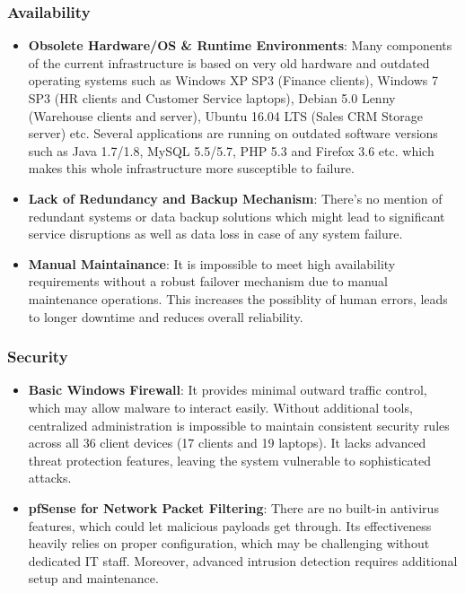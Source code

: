 \documentclass{llncs}
\begin{document}
\subsubsection*{Availability}
\begin{itemize}
    \item \textbf{Obsolete Hardware/OS \& Runtime Environments}:
          Many components of the current infrastructure is based on very old hardware and outdated operating systems such as
          Windows XP SP3 (Finance clients), Windows 7 SP3 (HR clients and Customer Service laptops), Debian 5.0 Lenny (Warehouse clients and server),
          Ubuntu 16.04 LTS (Sales CRM Storage server) etc. Several applications are running on outdated software versions such as Java 1.7/1.8,
          MySQL 5.5/5.7, PHP 5.3 and Firefox 3.6 etc. which makes this whole infrastructure more susceptible to failure.
    \item \textbf{Lack of Redundancy and Backup Mechanism}:
          There's no mention of redundant systems or data backup solutions which might lead to significant service disruptions as well as data loss in case of any system failure.

    \item \textbf{Manual Maintainance}:
          It is impossible to meet high availability requirements without a robust failover mechanism due to manual maintenance operations.
          This increases the possiblity of human errors, leads to longer downtime and reduces overall reliability.
\end{itemize}

\subsubsection*{Security}
\begin{itemize}
    \item \textbf{Basic Windows Firewall}:
          It provides minimal outward traffic control, which may allow malware to interact easily.
          Without additional tools, centralized administration is impossible to maintain consistent security rules across all 36 client devices (17 clients and 19 laptops).
          It lacks advanced threat protection features, leaving the system vulnerable to sophisticated attacks.
    \item \textbf{pfSense for Network Packet Filtering}:
          There are no built-in antivirus features, which could let malicious payloads get through. Its effectiveness heavily relies on proper configuration, which may be challenging without dedicated IT staff.
          Moreover, advanced intrusion detection requires additional setup and maintenance.

\end{itemize}
\end{document}
